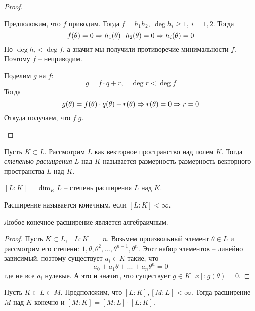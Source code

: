 \begin{proof}
	\begin{MyList}
		\item Предположим, что $f$ приводим. Тогда $f = h_1 h_2, \ \deg h_i \geqslant 1, \ i = 1, 2$. Тогда
		\[f(\theta) = 0 \Rightarrow h_1 (\theta) \cdot h_2 (\theta) = 0 \Rightarrow h_i(\theta) = 0\]
		Но $\deg h_i < \deg f$, а значит мы получили противоречие минимальности $f$. Поэтому $f$ -- неприводим.

		\item Поделим $g$ на $f$:
		\[g = f \cdot q + r, \quad \deg r < \deg f\]
		Тогда
		\[g(\theta) = f(\theta) \cdot q(\theta) + r(\theta) \Rightarrow r(\theta) = 0 \Rightarrow r = 0\]
		Откуда получаем, что $f | g$.
	\end{MyList}
\end{proof}

\begin{Def}
	Пусть $K \subset L$. Рассмотрим $L$ как векторное пространство над полем $K$.
	Тогда \textit{степенью расширения} $L$ над $K$ называется размерность размерность векторного пространства $L$ над $K$.   
\end{Def}

\begin{notation}
	$[L : K] = \dim_K L$ -- степень расширения $L$ над $K$. 
\end{notation}

\begin{Rem}
	Расширение называется конечным, если $[L : K] < \infty$. 
\end{Rem}

\begin{Thm}
	Любое конечное расширение является алгебраичным.
\end{Thm}

\begin{proof}
	Пусть $K \subset L$, $[L : K] = n$. Возьмем произвольный элемент $\theta \in L$ и рассмотрим его степени: $1, \theta, \theta^2, ..., \theta^{n - 1}, \theta^n$. 
	Этот набор элементов -- линейно зависимый, поэтому существует $a_i \in K$ такие, что 
	\[a_0 + a_1 \theta + ... + a_n \theta^n = 0\]
	где не все $a_i$ нулевые. А это и значит, что существует $g \in K[x] : g(\theta) = 0$.  
\end{proof}

\begin{Thm}
	Пусть $K \subset L \subset M$. Предположим, что $[L : K], [M : L] < \infty$.
	Тогда расширение $M$ над $K$ конечно и $[M : K] = [M : L] \cdot [L : K]$.   
\end{Thm}

